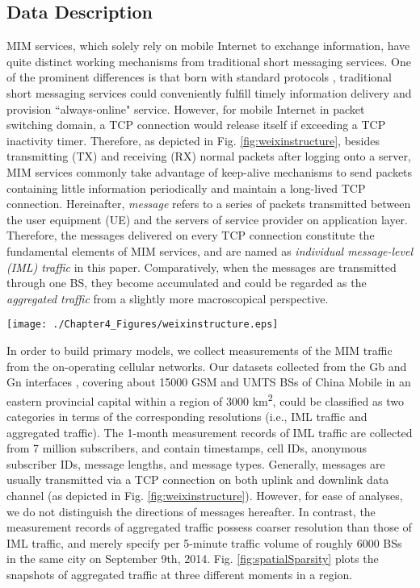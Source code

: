 \subsection{Data Description}
MIM services, which solely rely on mobile Internet to exchange information, have quite distinct working mechanisms from traditional short messaging services. One of the prominent differences is that born with standard protocols \cite{institute1985services}, traditional short messaging services could conveniently fulfill timely information delivery and  provision ``always-online" service. However, for mobile Internet in packet switching domain, a TCP connection would release itself if exceeding a TCP inactivity timer. Therefore, as depicted in Fig. \ref{fig:weixinstructure}, besides transmitting (TX) and receiving (RX) normal packets after logging onto a server, MIM services commonly take advantage of keep-alive mechanisms to send packets containing little information periodically and maintain a long-lived TCP connection. Hereinafter, \textit{message} refers to a series of packets transmitted between the user equipment (UE) and the servers of service provider on application layer. Therefore, the messages delivered on every TCP connection constitute the fundamental elements of MIM services, and are named as \textit{individual message-level (IML) traffic} in this paper. Comparatively, when the messages are transmitted through one BS, they become accumulated and could be regarded as the \textit{aggregated traffic} from a slightly more macroscopical perspective.

\begin{figure*}
\centering
\texttt{[image: ./Chapter4\_Figures/weixinstructure.eps]}
\caption{An illustration of mobile instantaneous messaging activities.}
\label{fig:weixinstructure}
\end{figure*}

In order to build primary models, we collect measurements of the MIM traffic from the on-operating cellular networks. Our datasets collected from the Gb and Gn interfaces \cite{zhou2014understanding}, covering about 15000 GSM and UMTS BSs of China Mobile in an eastern provincial capital within a region of 3000 km\textsuperscript{2}, could be classified as two categories in terms of the corresponding resolutions (i.e., IML traffic and aggregated traffic). The 1-month measurement records of IML traffic are collected from 7 million subscribers, and contain timestamps, cell IDs, anonymous subscriber IDs, message lengths, and message types. Generally, messages are usually transmitted via a TCP connection on both uplink and downlink data channel (as depicted in Fig. \ref{fig:weixinstructure}). However, for ease of analyses, we do not distinguish the directions of messages hereafter. In contrast, the measurement records of aggregated traffic possess coarser resolution than those of IML traffic, and merely specify per 5-minute traffic volume of roughly 6000 BSs in the same city on September 9th, 2014. Fig. \ref{fig:spatialSparsity} plots the snapshots of aggregated traffic at three different moments in a region.

